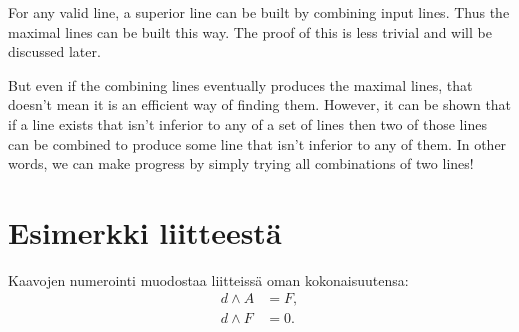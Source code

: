 \documentclass[english, 12pt, a4paper, sci, utf8, a-1b, online]{aaltothesis}
\begin{document}
For any valid line, a superior line can be built by combining input lines. Thus the maximal lines can be built this way. The proof of this is less trivial and will be discussed later.

But even if the combining lines eventually produces the maximal lines, that doesn't mean it is an efficient way of finding them. However, it can be shown that if a line exists that isn't inferior to any of a set of lines then two of those lines can be combined to produce some line that isn't inferior to any of them. In other words, we can make progress by simply trying all combinations of two lines!

\clearpage
\thesisbibliography{}




\clearpage
\thesisappendix{}

\section{Esimerkki liitteestä\label{LiiteA}}

Kaavojen numerointi muodostaa liitteissä oman kokonaisuutensa:
\begin{align}
d \wedge A &= F, \label{liitekaava1}\\
d \wedge F &= 0. \label{liitekaava2}
\end{align}
\end{document}
